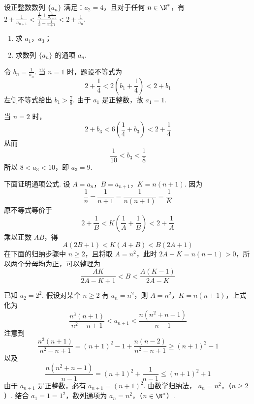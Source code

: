 \begin{problem}
设正整数数列 \(\{a_n\}\) 满足：\(a_2 = 4\)，且对于任何 \(n \in \N^*\)，有 \(2 + \frac{1}{a_{n+1}} < \frac{\frac{1}{a_n} + \frac{1}{a_{n+1}}}{\frac{1}{n} - \frac{1}{n+1}} < 2 + \frac{1}{a_n}\).

\begin{enumerate}
\item 求 \(a_1\)，\(a_3\)；
\item 求数列 \(\{a_n\}\) 的通项 \(a_n\).
\end{enumerate}
\end{problem}

\begin{solution}
令 \(b_n=\frac{1}{a_n}\). 当 \(n=1\) 时，题设不等式为
\[
2+\frac14<2\left(b_1+\frac14\right)<2+b_1
\]
左侧不等式给出 \(b_1>\frac78\). 由于 \(a_1\) 是正整数，故 \(a_1=1\).

当 \(n=2\) 时，
\[
2+b_3<6\left(\frac14+b_3\right)<2+\frac14
\]
从而
\[
\frac1{10}<b_3<\frac18
\]
所以 \(8<a_3<10\)，即 \(a_3=9\).

下面证明通项公式. 设 \(A=a_n\)，\(B=a_{n+1}\)，\(K=n(n+1)\). 因为
\[
\frac1n-\frac1{n+1}=\frac1{n(n+1)}=\frac1K
\]
原不等式等价于
\[
2+\frac1B<K\left(\frac1A+\frac1B\right)<2+\frac1A
\]
乘以正数 \(AB\)，得
\[
A(2B+1)<K(A+B)<B(2A+1)
\]
在下面的归纳步骤中 \(n\geqslant2\)，且将取 \(A=n^2\)，此时
\(2A-K=n(n-1)>0\)，所以两个分母均为正，可以整理为
\[
\frac{AK}{2A-K+1}<B<\frac{A(K-1)}{2A-K}
\]

已知 \(a_2=2^2\). 假设对某个 \(n\geqslant2\) 有 \(a_n=n^2\)，则 \(A=n^2\)，\(K=n(n+1)\)，上式化为
\[
\frac{n^3(n+1)}{n^2-n+1}<a_{n+1}<\frac{n(n^2+n-1)}{n-1}
\]
注意到
\[
\frac{n^3(n+1)}{n^2-n+1}= (n+1)^2-1+\frac{n(n-2)}{n^2-n+1}\geqslant(n+1)^2-1
\]
以及
\[
\frac{n(n^2+n-1)}{n-1}=(n+1)^2+\frac1{n-1}\leqslant(n+1)^2+1
\]
由于 \(a_{n+1}\) 是正整数，必有 \(a_{n+1}=(n+1)^2\). 由数学归纳法，
\(a_n=n^2\)，（\(n\geqslant2\)）.
结合 \(a_1=1=1^2\)，数列通项为
\(a_n=n^2\)，（\(n\in\N^*\)）.
\end{solution}
